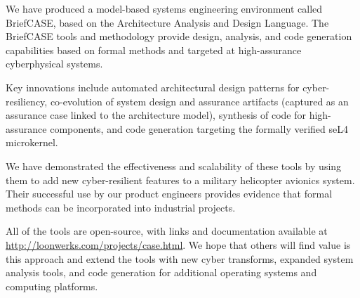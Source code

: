 We have produced a model-based systems engineering environment
called BriefCASE, based on the Architecture Analysis and Design
Language.  The BriefCASE tools and methodology provide design, analysis, and code
generation capabilities based on formal methods and targeted at
high-assurance cyberphysical systems.  

Key innovations include automated architectural design patterns 
for cyber-resiliency, co-evolution of system design and assurance 
artifacts (captured as an assurance case linked to the architecture model), 
synthesis of code for high-assurance components, and code generation
targeting the formally verified seL4 microkernel.  

We have demonstrated the effectiveness and scalability of these 
tools by using them to add new cyber-resilient features to a military 
helicopter avionics system.  Their successful use by our product engineers 
provides evidence that formal methods can be incorporated into 
industrial projects.  

All of the tools are open-source, with links and documentation available
at \url{http://loonwerks.com/projects/case.html}.  We hope that others 
will find value is this approach and extend the tools with new cyber transforms, 
expanded system analysis tools, and code generation for additional operating 
systems and computing platforms.  







%


